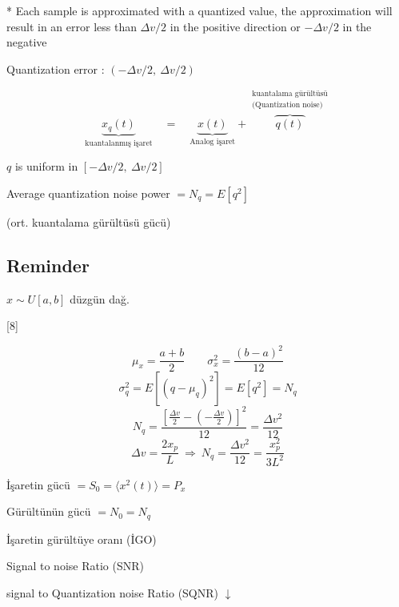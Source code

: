 \documentclass[11pt,a4paper]{article}
\begin{document}
* Each sample is approximated with a quantized value, the approximation will result in an error less than $\Delta v/2$ in the positive direction or $-\Delta v/2$ in the negative 

Quantization error : $(-\Delta v/2,\ \Delta v/2)$

\[
\underbrace{x_q(t)}_{\text{kuantalanmış işaret}} \quad = \quad \underbrace{x(t)}_{\text{Analog işaret}} + \overbrace{q(t)}^{\substack{\text{kuantalama gürültüsü}\\ \text{(Quantization noise)}}}
\]

$q$ is uniform in $[-\Delta v/2,\ \Delta v/2]$

Average quantization noise power $=N_q=E[q^2]$

(ort. kuantalama gürültüsü gücü)

\subsection{Reminder}
$x\sim U[a,b]$ düzgün dağ.

[8]

\[ \mu_x=\frac{a+b}{2} \qquad \sigma_x^2=\frac{(b-a)^2}{12} \]
\[ \sigma_q^2=E\!\left[(q-\mu_q)^2\right]=E[q^2]=N_q \]
\[ N_q=\frac{\left[\frac{\Delta v}{2}-\left(-\frac{\Delta v}{2}\right)\right]^2}{12}=\frac{\Delta v^2}{12} \]
\[ \Delta v=\frac{2x_p}{L}\ \Longrightarrow\ N_q=\frac{\Delta v^2}{12}=\frac{x_p^2}{3L^2} \]

İşaretin gücü $=S_0=\langle x^2(t)\rangle=P_x$

Gürültünün gücü $=N_0=N_q$

İşaretin gürültüye oranı (İGO)

Signal to noise Ratio (SNR)

\noindent\hfill signal to Quantization noise Ratio (SQNR) $\downarrow$

\end{document}
